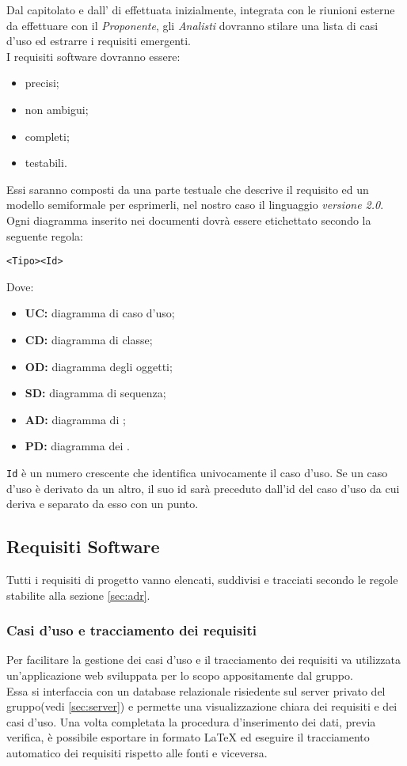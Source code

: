\documentclass{scalatekids-article}
\begin{document}
Dal capitolato e dall' di  effettuata
inizialmente, integrata con le riunioni esterne da effettuare con il
\textit{Proponente}, gli \textit{Analisti} dovranno stilare una lista di casi
d'uso ed estrarre i requisiti emergenti.\\
I requisiti software dovranno essere:
\begin{itemize}
    \item precisi;
    \item non ambigui;
    \item completi;
    \item testabili.
\end{itemize}
Essi saranno composti da una parte testuale che descrive il requisito ed un
modello semiformale per esprimerli, nel nostro caso il linguaggio 
\textit{versione 2.0}. Ogni diagramma inserito nei documenti dovrà essere
etichettato secondo la seguente regola:
\begin{center}
    \verb=<Tipo><Id>=
\end{center}
Dove:
\begin{itemize}
    \item\textbf{UC:} diagramma di caso d'uso;
    \item\textbf{CD:} diagramma di classe;
    \item\textbf{OD:} diagramma degli oggetti;
    \item\textbf{SD:} diagramma di sequenza;
    \item\textbf{AD:} diagramma di ;
    \item\textbf{PD:} diagramma dei .
\end{itemize}
\verb=Id= è un numero crescente che identifica
univocamente il caso d'uso. Se un caso d'uso è derivato da un altro, il suo id
sarà preceduto dall'id del caso d'uso da cui deriva e separato da esso con un
punto.

\subsection{Requisiti Software}
Tutti i requisiti di progetto vanno elencati, suddivisi e tracciati secondo le regole stabilite alla sezione \ref{sec:adr}.
\subsubsection{Casi d'uso e tracciamento dei requisiti}
\label{sec:front-end}
Per facilitare la gestione dei casi d'uso e il tracciamento dei requisiti
va utilizzata un'applicazione web sviluppata per lo scopo appositamente dal
gruppo.\\Essa si interfaccia con un database relazionale risiedente sul server
privato del gruppo(vedi \ref{sec:server}) e permette una visualizzazione chiara dei
requisiti e dei casi d'uso. Una volta completata la procedura d'inserimento dei
dati, previa verifica, è possibile esportare in formato
\LaTeX\xspace ed eseguire il tracciamento automatico dei requisiti rispetto alle
fonti e viceversa.
\end{document}
